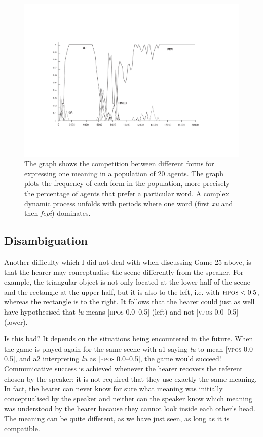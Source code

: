 \begin{figure}[htbp]
  \centerline{\includegraphics[width=\textwidth]{chap2/figs/competition-1.pdf}}
\caption{\label{competition1}The graph shows the competition between different forms for
expressing one meaning in a population of 20 agents. The graph plots 
the frequency of each form in the population, more precisely the percentage
of agents that prefer a particular word. A complex dynamic
process unfolds with periods where one word (first \textit{xu} and then \textit{fepi}) dominates.} 
\end{figure}

\subsection{Disambiguation}

Another difficulty which I did not deal with when discussing Game 25 above,
is that the hearer may conceptualise
the scene differently from the speaker. For example, 
the triangular object is not only located at the lower half
of the scene and the rectangle at the upper half, 
but it is also to the left, i.e. with $\textsc{hpos} < 0.5$, whereas
the rectangle is to the right. It follows that the 
hearer could just as well have hypothesised that \textit{lu} means [\textsc{hpos} 0.0–0.5] (left)
and not [\textsc{vpos} 0.0–0.5] (lower). 

Is this bad? It depends on the situations being encountered
in the future. When the game is played again for the
same scene with {\bfshape a1} saying \textit{lu} to mean [\textsc{vpos} 0.0–0.5], and 
{\bfshape a2} interpreting \textit{lu} as [\textsc{hpos} 0.0–0.5], the game would succeed! 
Communicative success is achieved whenever the 
hearer recovers the referent chosen by the 
speaker; it is not required that they 
use exactly the same meaning. In fact, the hearer can never know
for sure what meaning was initially conceptualised by the speaker and 
neither can the speaker know which meaning was understood 
by the hearer because they cannot look inside each
other's head. The meaning can be quite different, 
as we have just seen, as long as it is compatible. 

